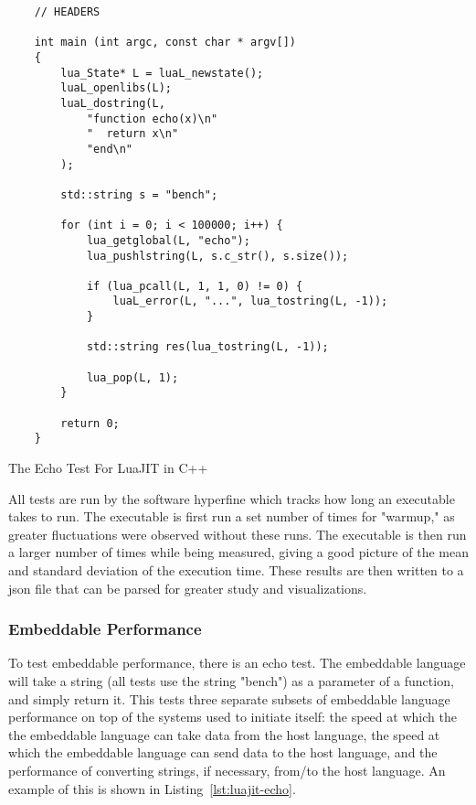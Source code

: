 \begin{listing}[H]
    \begin{verbatim}
    // HEADERS

    int main (int argc, const char * argv[])
    {
        lua_State* L = luaL_newstate();
        luaL_openlibs(L);
        luaL_dostring(L, 
            "function echo(x)\n"
            "  return x\n"
            "end\n"
        );

        std::string s = "bench";

        for (int i = 0; i < 100000; i++) {
            lua_getglobal(L, "echo");
            lua_pushlstring(L, s.c_str(), s.size());

            if (lua_pcall(L, 1, 1, 0) != 0) {
                luaL_error(L, "...", lua_tostring(L, -1));
            }

            std::string res(lua_tostring(L, -1));

            lua_pop(L, 1);
        }

        return 0;
    }
    \end{verbatim}
    \caption{The Echo Test For LuaJIT in C++}
    \label{lst:luajit-echo}
\end{listing}

All tests are run by the software hyperfine\cite{hyperfine} which tracks how long an executable takes to run. The executable is first run a set number of times for "warmup," as greater fluctuations were observed without these runs. The executable is then run a larger number of times while being measured, giving a good picture of the mean and standard deviation of the execution time. These results are then written to a json file that can be parsed for greater study and visualizations.

\subsubsection{Embeddable Performance}
To test embeddable performance, there is an echo test. The embeddable language will take a string (all tests use the string "bench") as a parameter of a function, and simply return it. This tests three separate subsets of embeddable language performance on top of the systems used to initiate itself: the speed at which the the embeddable language can take data from the host language, the speed at which the embeddable language can send data to the host language, and the performance of converting strings, if necessary, from/to the host language. An example of this is shown in Listing~\ref{lst:luajit-echo}.

